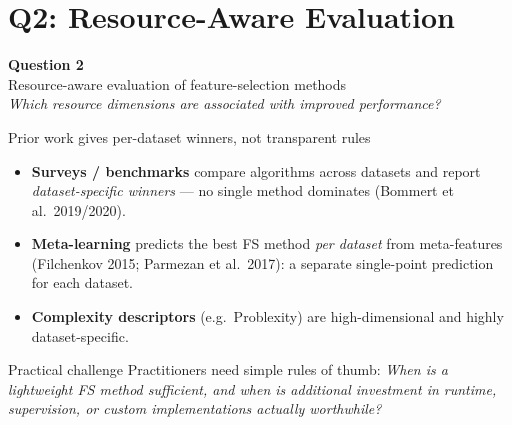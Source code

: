 \documentclass[aspectratio=169,10pt,dvipsnames]{beamer}
\begin{document}
\section{Q2: Resource-Aware Evaluation}

{
\begin{frame}
\vspace{1.6cm}
\begin{center}
{\Large\bfseries\color{bgucolor} Question 2}\\[8pt]
{\large Resource-aware evaluation of feature-selection methods}\\[16pt]
\small\color{gray}
\textit{Which resource dimensions are associated with improved performance?}
\end{center}
\end{frame}
}

\begin{frame}{Prior work gives per-dataset winners, not transparent rules}

\vspace{0.41cm}

\begin{itemize}
  \item \textbf{Surveys / benchmarks} compare algorithms across datasets and
        report \emph{dataset-specific winners} --- no single method dominates
        (Bommert et al.\ 2019/2020).
  \item \textbf{Meta-learning} predicts the best FS method \emph{per dataset}
        from meta-features (Filchenkov 2015; Parmezan et al.\ 2017): a separate
        single-point prediction for each dataset.
  \item \textbf{Complexity descriptors} (e.g.\ Problexity) are high-dimensional
        and highly dataset-specific.
\end{itemize}

\pause
\vspace{0.15cm}
\begin{block}{Practical challenge}
Practitioners need simple rules of thumb:
\emph{When is a lightweight FS method sufficient, and when is additional
investment in runtime, supervision, or custom implementations actually worthwhile?}
\end{block}


\end{frame}
\end{document}
